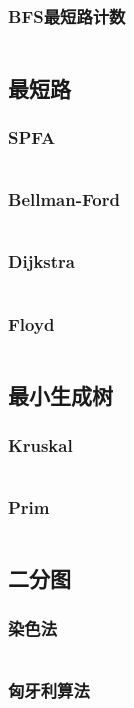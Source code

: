 \documentclass[a4paper,12pt]{article}
\begin{document}
\subsubsection{BFS最短路计数}
\inputminted[breaklines, linenos]{c++}{graph/bdfs/sum.cc}
\subsection{最短路} %
\subsubsection{SPFA}
\inputminted[breaklines, linenos]{c++}{graph/shortest_path/spfa.cc}
\subsubsection{Bellman-Ford}
\inputminted[breaklines, linenos]{c++}{graph/shortest_path/bellman.cc}
\subsubsection{Dijkstra}
\inputminted[breaklines, linenos]{c++}{graph/shortest_path/dij.cc}
\subsubsection{Floyd}
\inputminted[breaklines, linenos]{c++}{graph/shortest_path/floyd.cc}
\subsection{最小生成树} %
\subsubsection{Kruskal} 
\inputminted[breaklines, linenos]{c++}{graph/mst/kruskal.cc}
\subsubsection{Prim} 
\inputminted[breaklines, linenos]{c++}{graph/mst/prim.cc}
\subsection{二分图} %
\subsubsection{染色法} 
\inputminted[breaklines, linenos]{c++}{graph/2graph/judge.cc}
\subsubsection{匈牙利算法} 
\inputminted[breaklines, linenos]{c++}{graph/2graph/xyl.cc}
\end{document}
